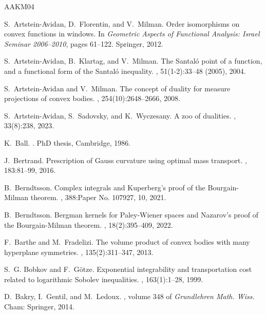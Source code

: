 \documentclass[10pt]{amsart}
\theoremstyle{definition}
\theoremstyle{remark}
\begin{document}
\newcommand{\etalchar}[1]{$^{#1}$}
\begin{thebibliography}{AAKM04}

S.~Artstein-Avidan, D.~Florentin, and V.~Milman.
\newblock Order isomorphisms on convex functions in windows.
\newblock In {\em Geometric Aspects of Functional Analysis: Israel Seminar
  2006--2010}, pages 61--122. Springer, 2012.

S.~Artstein-Avidan, B.~Klartag, and V.~Milman.
\newblock The {S}antal\'{o} point of a function, and a functional form of the
  {S}antal\'{o} inequality.
, 51(1-2):33--48 (2005), 2004.

S.~Artstein-Avidan and V.~Milman.
\newblock The concept of duality for measure projections of convex bodies.
, 254(10):2648--2666, 2008.

S.~Artstein-Avidan, S.~Sadovsky, and K.~Wyczesany.
\newblock A zoo of dualities.
, 33(8):238, 2023.

K.~Ball.
.
\newblock PhD thesis, Cambridge, 1986.

J.~Bertrand.
\newblock Prescription of {Gauss} curvature using optimal mass transport.
, 183:81--99, 2016.

B.~Berndtsson.
\newblock Complex integrals and {K}uperberg's proof of the {B}ourgain-{M}ilman
  theorem.
, 388:Paper No. 107927, 10, 2021.

B.~Berndtsson.
\newblock Bergman kernels for {P}aley-{W}iener spaces and {N}azarov's proof of
  the {B}ourgain-{M}ilman theorem.
, 18(2):395--409, 2022.

F.~Barthe and M.~Fradelizi.
\newblock The volume product of convex bodies with many hyperplane symmetries.
, 135(2):311--347, 2013.

S.~G. Bobkov and F.~G{\"o}tze.
\newblock Exponential integrability and transportation cost related to
  logarithmic {Sobolev} inequalities.
, 163(1):1--28, 1999.

D.~Bakry, I.~Gentil, and M.~Ledoux.
, volume
  348 of {\em Grundlehren Math. Wiss.}
\newblock Cham: Springer, 2014.


\end{thebibliography}
\end{document}
